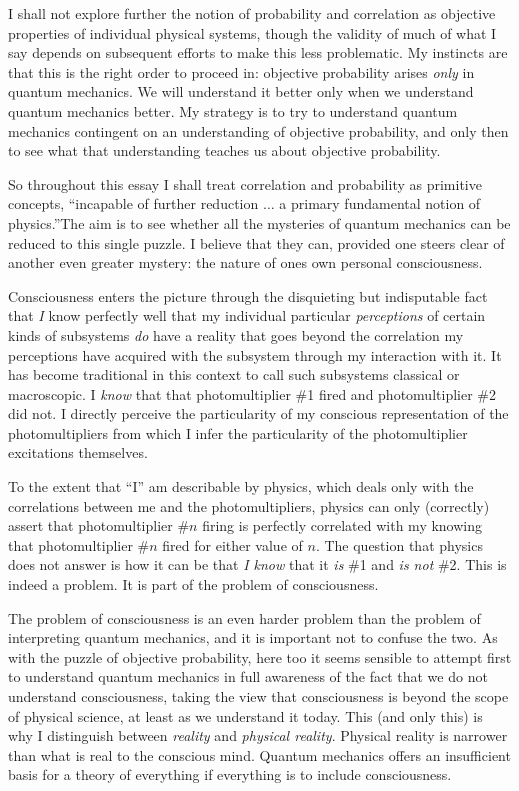 I shall not explore further the notion of probability and correlation
as objective properties of individual physical systems, though the
validity of much of what I say depends on subsequent efforts to make
this less problematic.  My instincts are that this is the right order
to proceed in: objective probability arises {\it only\/} in quantum
mechanics.  We will understand it better only when we understand
quantum mechanics better.  My strategy is to try to understand quantum
mechanics contingent on an understanding of objective probability, and
only then to see what that understanding teaches us about objective
probability.\fn  

So throughout this essay I shall treat correlation and probability as
primitive concepts, ``incapable of further reduction $\ldots$ a
primary fundamental notion of physics.''\fn The aim is to
see whether all the mysteries of quantum mechanics can be reduced to
this single puzzle.  I believe that they can, provided one steers
clear of another even greater mystery: the nature of ones own personal
consciousness.  

\bigskip{}\nobreak Consciousness
enters the picture through the disquieting but indisputable fact that
{\it I\/} know perfectly well that my individual particular {\it
perceptions\/} of certain kinds of subsystems {\it do\/} have a
reality that goes beyond the correlation my perceptions have acquired
with the subsystem through my interaction with it.  It has become
traditional in this context to call such subsystems classical or
macroscopic.  I {\it know\/} that that photomultiplier
\#1 fired and photomultiplier \#2 did not.  I directly perceive the
particularity of my conscious representation of the photomultipliers
from which I infer the particularity of the photomultiplier
excitations themselves.  

To the extent that ``I'' am describable by physics, which deals only
with the correlations between me and the photomultipliers, physics
can only (correctly) assert that photomultiplier
\#$n$ firing is perfectly correlated with my knowing that
photomultiplier \#$n$ fired for either value of $n$.  The question
that physics does not answer is how it can be that {\it I know\/}
that it {\it is\/} \#1 and {\it is not\/} \#2.  This is indeed a
problem.  It is part of the problem of  consciousness.  

The problem of consciousness is an even harder problem than the
problem of interpreting quantum mechanics, and it is important not to
confuse the two.  As with the puzzle of objective probability, here
too it seems sensible to attempt first to understand quantum mechanics
in full awareness of the fact that we do not understand consciousness,
taking the view that consciousness is beyond the scope of physical
science, at least as we understand it today.  This (and only this) is
why I distinguish between {\it reality\/} and {\it physical
reality\/}.  Physical reality is narrower than what is real to the
conscious mind.  Quantum mechanics offers an insufficient basis for a
theory of everything if everything is to include consciousness.

